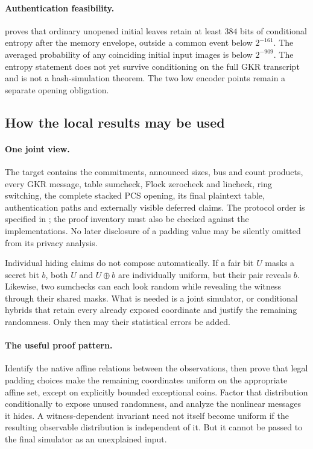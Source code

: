 \paragraph{Authentication feasibility.}  proves that ordinary unopened initial leaves retain at least $384$ bits of conditional entropy after the memory envelope, outside a common event below $2^{-161}$. The averaged probability of any coinciding initial input images is below $2^{-909}$. The entropy statement does not yet survive conditioning on the full GKR transcript and is not a hash-simulation theorem. The two low encoder points remain a separate opening obligation.


\subsection{How the local results may be used}\label{sec:zk-composition}

\paragraph{One joint view.} The target contains the commitments, announced sizes, bus and count products, every GKR message, table sumcheck, Flock zerocheck and lincheck, ring switching, the complete stacked PCS opening, its final plaintext table, authentication paths and externally visible deferred claims. The protocol order is specified in ; the proof inventory must also be checked against the implementations. No later disclosure of a padding value may be silently omitted from its privacy analysis.

Individual hiding claims do not compose automatically. If a fair bit $U$ masks a secret bit $b$, both $U$ and $U\oplus b$ are individually uniform, but their pair reveals $b$. Likewise, two sumchecks can each look random while revealing the witness through their shared masks. What is needed is a joint simulator, or conditional hybrids that retain every already exposed coordinate and justify the remaining randomness. Only then may their statistical errors be added.

\paragraph{The useful proof pattern.} Identify the native affine relations between the observations, then prove that legal padding choices make the remaining coordinates uniform on the appropriate affine set, except on explicitly bounded exceptional coins. Factor that distribution conditionally to expose unused randomness, and analyze the nonlinear messages it hides. A witness-dependent invariant need not itself become uniform if the resulting observable distribution is independent of it. But it cannot be passed to the final simulator as an unexplained input.

